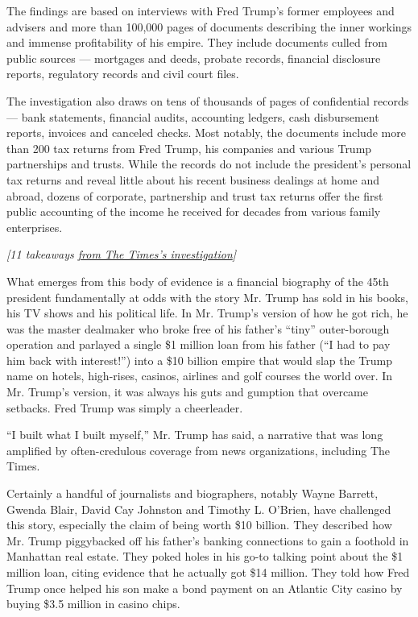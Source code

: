 The findings are based on interviews with Fred Trump's former employees
and advisers and more than 100,000 pages of documents describing the
inner workings and immense profitability of his empire. They include
documents culled from public sources --- mortgages and deeds, probate
records, financial disclosure reports, regulatory records and civil
court files.

The investigation also draws on tens of thousands of pages of
confidential records --- bank statements, financial audits, accounting
ledgers, cash disbursement reports, invoices and canceled checks. Most
notably, the documents include more than 200 tax returns from Fred
Trump, his companies and various Trump partnerships and trusts. While
the records do not include the president's personal tax returns and
reveal little about his recent business dealings at home and abroad,
dozens of corporate, partnership and trust tax returns offer the first
public accounting of the income he received for decades from various
family enterprises.

\emph{{[}11 takeaways
\href{https://www.nytimes.com/2018/10/02/us/politics/donald-trump-wealth-fred-trump.html}{from
The Times's investigation}{]}}

What emerges from this body of evidence is a financial biography of the
45th president fundamentally at odds with the story Mr. Trump has sold
in his books, his TV shows and his political life. In Mr. Trump's
version of how he got rich, he was the master dealmaker who broke free
of his father's ``tiny'' outer-borough operation and parlayed a single
\$1 million loan from his father (``I had to pay him back with
interest!'') into a \$10 billion empire that would slap the Trump name
on hotels, high-rises, casinos, airlines and golf courses the world
over. In Mr. Trump's version, it was always his guts and gumption that
overcame setbacks. Fred Trump was simply a cheerleader.

``I built what I built myself,'' Mr. Trump has said, a narrative that
was long amplified by often-credulous coverage from news organizations,
including The Times.

Certainly a handful of journalists and biographers, notably Wayne
Barrett, Gwenda Blair, David Cay Johnston and Timothy L. O'Brien, have
challenged this story, especially the claim of being worth \$10 billion.
They described how Mr. Trump piggybacked off his father's banking
connections to gain a foothold in Manhattan real estate. They poked
holes in his go-to talking point about the \$1 million loan, citing
evidence that he actually got \$14 million. They told how Fred Trump
once helped his son make a bond payment on an Atlantic City casino by
buying \$3.5 million in casino chips.

